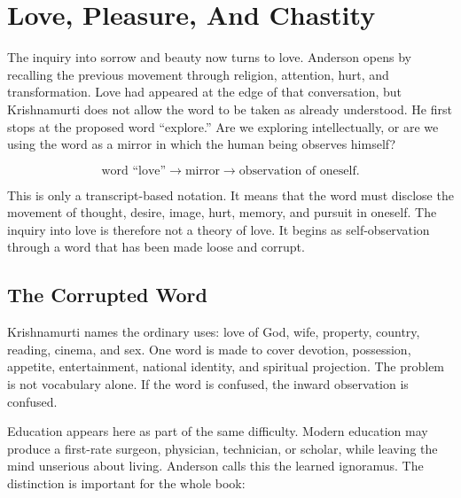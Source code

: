 \documentclass[11pt,oneside]{book}
\begin{document}

\chapter{Love, Pleasure, And Chastity}

The inquiry into sorrow and beauty now turns to love. Anderson opens by recalling the previous movement through religion, attention, hurt, and transformation. Love had appeared at the edge of that conversation, but Krishnamurti does not allow the word to be taken as already understood. He first stops at the proposed word ``explore.'' Are we exploring intellectually, or are we using the word as a mirror in which the human being observes himself?

\begin{equation}
\text{word ``love''}
\longrightarrow
\text{mirror}
\longrightarrow
\text{observation of oneself}.
\end{equation}

This is only a transcript-based notation. It means that the word must disclose the movement of thought, desire, image, hurt, memory, and pursuit in oneself. The inquiry into love is therefore not a theory of love. It begins as self-observation through a word that has been made loose and corrupt.

\section{The Corrupted Word}

Krishnamurti names the ordinary uses: love of God, wife, property, country, reading, cinema, and sex. One word is made to cover devotion, possession, appetite, entertainment, national identity, and spiritual projection. The problem is not vocabulary alone. If the word is confused, the inward observation is confused.

Education appears here as part of the same difficulty. Modern education may produce a first-rate surgeon, physician, technician, or scholar, while leaving the mind unserious about living. Anderson calls this the learned ignoramus. The distinction is important for the whole book:
\end{document}
